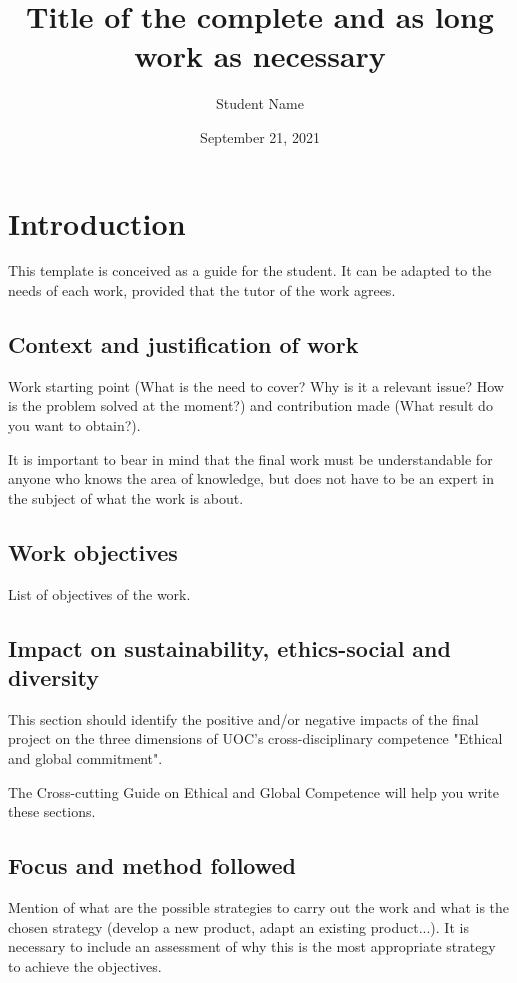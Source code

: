 \documentclass[ENG]{TFUOC}%
\title{Title of the complete and as long work as necessary}
\author{Student Name}
\date{September 21, 2021}
\begin{document}
\estructura

\tableofcontents

\listoffigures

\listoftables




\chapter{Introduction}

This template is conceived as a guide for the student. It can be adapted to the needs of each work, provided that the tutor of the work agrees.

\section{Context and justification of work}


Work starting point (What is the need to cover? Why is it a relevant issue? How is the problem solved at the moment?) and contribution made (What result do you want to obtain?).

It is important to bear in mind that the final work must be understandable for anyone who knows the area of knowledge, but does not have to be an expert in the subject of what the work is about.

\section{Work objectives}

List of objectives of the work.

\section{Impact on sustainability, ethics-social and diversity}
\label{s:etic}

This section should identify the positive and/or negative impacts of the final project on the three dimensions of UOC's cross-disciplinary competence "Ethical and global commitment".
 
The Cross-cutting Guide on Ethical and Global Competence will help you write these sections.


\section{Focus and method followed}

Mention of what are the possible strategies to carry out the work and what is the chosen strategy (develop a new product, adapt an existing product...). It is necessary to include an assessment of why this is the most appropriate strategy to achieve the objectives.   	
\end{document}
